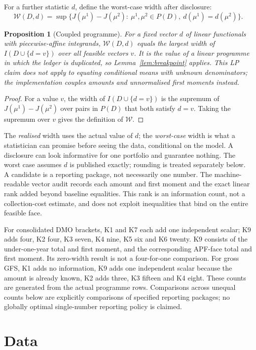 \documentclass[11pt,a4paper]{article}
\newtheorem{proposition}{Proposition}
\theoremstyle{remark}
\begin{document}
For a further statistic $d$, define the worst-case width after disclosure:
\[
\mathcal W(D,d)=\sup\{J(\mu^1)-J(\mu^2):\ \mu^1,\mu^2\in P(D),\ d(\mu^1)=d(\mu^2)\}.
\]
\begin{proposition}[Coupled programme]\label{prop:coupled}
For a fixed vector $d$ of linear functionals with piecewise-affine integrands, $\mathcal W(D,d)$ equals the largest width of $I(D\cup\{d=v\})$ over all feasible vectors $v$. It is the value of a linear programme in which the ledger is duplicated, so Lemma~\ref{lem:breakpoint} applies. This LP claim does not apply to equating conditional means with unknown denominators; the implementation couples amounts and unnormalised first moments instead.
\end{proposition}
\begin{proof}
For a value $v$, the width of $I(D\cup\{d=v\})$ is the supremum of $J(\mu^1)-J(\mu^2)$ over pairs in $P(D)$ that both satisfy $d=v$. Taking the supremum over $v$ gives the definition of $\mathcal W$.
\end{proof}

The \emph{realised} width uses the actual value of $d$; the \emph{worst-case} width is what a statistician can promise before seeing the data, conditional on the model. A disclosure can look informative for one portfolio and guarantee nothing. The worst case assumes $d$ is published exactly; rounding is treated separately below. A candidate is a reporting package, not necessarily one number. The machine-readable vector audit records each amount and first moment and the exact linear rank added beyond baseline equalities. This rank is an information count, not a collection-cost estimate, and does not exploit inequalities that bind on the entire feasible face.

For consolidated DMO brackets, K1 and K7 each add one independent scalar; K9 adds four, K2 four, K3 seven, K4 nine, K5 six and K6 twenty. K9 consists of the under-one-year total and first moment, and the corresponding APF-face total and first moment. Its zero-width result is not a four-for-one comparison. For gross GFS, K1 adds no information, K9 adds one independent scalar because the amount is already known, K2 adds three, K3 fifteen and K4 eight. These counts are generated from the actual programme rows. Comparisons across unequal counts below are explicitly comparisons of specified reporting packages; no globally optimal single-number reporting policy is claimed.

\section{Data}\label{sec:data}
\end{document}
